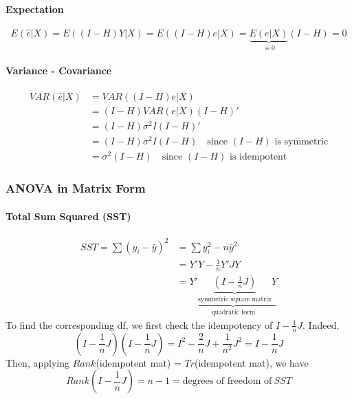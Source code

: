 \documentclass[11pt]{article}
\begin{document}
\paragraph{Expectation}
\begin{equation*}
    E(\hat{e}| X) = E((I - H)Y | X) = E((I - H)e | X) = \underbrace{E(e|X)}_{\equiv 0}(I - H) = 0
\end{equation*}

\paragraph{Variance - Covariance}
\begin{align*}
    VAR(\hat{e}|X) &= VAR((I-H)e|X) \\
    &= (I - H) VAR(e|X) (I - H)' \\
    &= (I - H) \sigma^2 I (I - H) '\\
    &= (I - H) \sigma^2 I (I - H) \quad \text{since $(I - H)$ is symmetric} \\
    &= \sigma^2 (I - H) \quad \text{since $(I - H)$ is idempotent}
\end{align*}

\subsubsection{ANOVA in Matrix Form}
\paragraph{Total Sum Squared (SST)}
\begin{align*}
    SST = \sum\left(y_{i}-\bar{y}\right)^{2} &=\sum y_{i}^{2}-n \bar{y}^{2} \\
    &= Y'Y - \frac{1}{n}Y'J Y \\
    &= \underbrace{Y'\underbrace{(I - \frac{1}{n}J)}_{\text{symmetric square matrix}} Y}_{\text{quadratic form}}
\end{align*}
To find the corresponding df, we first check the idempotency of $I - \frac{1}{n}J$. Indeed,
\begin{equation*}
    (I - \frac{1}{n}J)(I - \frac{1}{n}J) = I^2 - \frac{2}{n}J + \frac{1}{n^2}J^2 = I - \frac{1}{n}J
\end{equation*}
Then, applying $Rank$(idempotent mat) = $Tr$(idempotent mat), we have
\begin{equation*}
    Rank(I - \frac{1}{n}J) = n - 1 = \text{degrees of freedom of} ~SST
\end{equation*}
\end{document}
